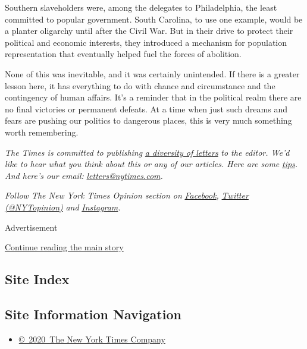 Southern slaveholders were, among the delegates to Philadelphia, the
least committed to popular government. South Carolina, to use one
example, would be a planter oligarchy until after the Civil War. But in
their drive to protect their political and economic interests, they
introduced a mechanism for population representation that eventually
helped fuel the forces of abolition.

None of this was inevitable, and it was certainly unintended. If there
is a greater lesson here, it has everything to do with chance and
circumstance and the contingency of human affairs. It's a reminder that
in the political realm there are no final victories or permanent
defeats. At a time when just such dreams and fears are pushing our
politics to dangerous places, this is very much something worth
remembering.

\emph{The Times is committed to publishing}
\href{https://www.nytimes.com/2019/01/31/opinion/letters/letters-to-editor-new-york-times-women.html}{\emph{a
diversity of letters}} \emph{to the editor. We'd like to hear what you
think about this or any of our articles. Here are some}
\href{https://help.nytimes.com/hc/en-us/articles/115014925288-How-to-submit-a-letter-to-the-editor}{\emph{tips}}\emph{.
And here's our email:}
\href{mailto:letters@nytimes.com}{\emph{letters@nytimes.com}}\emph{.}

\emph{Follow The New York Times Opinion section on}
\href{https://www.facebook.com/nytopinion}{\emph{Facebook}}\emph{,}
\href{http://twitter.com/NYTOpinion}{\emph{Twitter (@NYTopinion)}}
\emph{and}
\href{https://www.instagram.com/nytopinion/}{\emph{Instagram}}\emph{.}

Advertisement

\protect\hyperlink{after-bottom}{Continue reading the main story}

\hypertarget{site-index}{%
\subsection{Site Index}\label{site-index}}

\hypertarget{site-information-navigation}{%
\subsection{Site Information
Navigation}\label{site-information-navigation}}

\begin{itemize}
\tightlist
\item
  \href{https://help.nytimes.com/hc/en-us/articles/115014792127-Copyright-notice}{©~2020~The
  New York Times Company}
\end{itemize}


